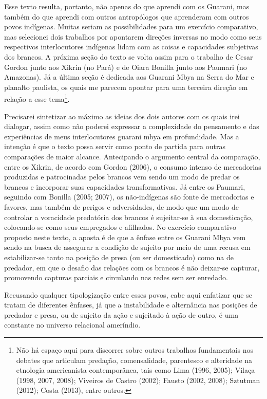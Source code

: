 Esse texto resulta, portanto, não apenas do que aprendi com os Guarani,
mas também do que aprendi com outros antropólogos que aprenderam com
outros povos indígenas. Muitas seriam as possibilidades para um
exercício comparativo, mas selecionei dois trabalhos por apontarem
direções inversas no modo como seus respectivos interlocutores
indígenas lidam com as coisas e capacidades subjetivas dos brancos. A
próxima seção do texto se volta assim para o trabalho de Cesar Gordon
junto aos Xikrin (no Pará) e de Oiara Bonilla junto aos Paumari (no
Amazonas). Já a última seção é dedicada aos Guarani Mbya na Serra do
Mar e planalto paulista, os quais me parecem apontar para uma terceira
direção em relação a esse tema\footnote{Não há espaço aqui para
discorrer sobre outros trabalhos fundamentais nos debates que articulam
predação, comensalidade, parentesco e alteridade na etnologia
americanista contemporânea, tais como Lima (1996, 2005); Vilaça (1998,
2007, 2008); Viveiros de Castro (2002); Fausto (2002, 2008); Sztutman
(2012); Costa (2013), entre outros.}. 

Precisarei sintetizar ao máximo as ideias dos dois autores com os quais
irei dialogar, assim como não poderei expressar a complexidade do
pensamento e das experiências de meus interlocutores guarani mbya em
profundidade. Mas a intenção é que o texto possa servir como ponto de
partida para outras comparações de maior alcance. Antecipando o
argumento central da comparação, entre os Xikrin, de acordo com Gordon
(2006), o consumo intenso de mercadorias produzidas e patrocinadas
pelos brancos vem sendo um modo de predar os brancos e incorporar suas
capacidades transformativas. Já entre os Paumari, seguindo com Bonilla
(2005; 2007), os não-indígenas são fonte de mercadorias e favores, mas
também de perigos e adversidades, de modo que um modo de controlar a
voracidade predatória dos brancos é sujeitar-se à sua domesticação,
colocando-se como seus empregados e afilhados. No exercício comparativo
proposto neste texto, a aposta é de que a ênfase entre os Guarani Mbya
vem sendo na busca de assegurar a condição de sujeito por meio de uma
recusa em estabilizar-se tanto na posição de presa (ou ser domesticado)
como na de predador, em que o desafio das relações com os brancos é não
deixar-se capturar, promovendo capturas parciais e circulando nas redes
sem ser enredado. 

Recusando qualquer tipologização entre esses povos, cabe aqui enfatizar
que se tratam de diferentes ênfases, já que a instabilidade e
alternância nas posições de predador e presa, ou de sujeito da ação e
sujeitado à ação de outro, é uma constante no universo relacional
ameríndio. 

